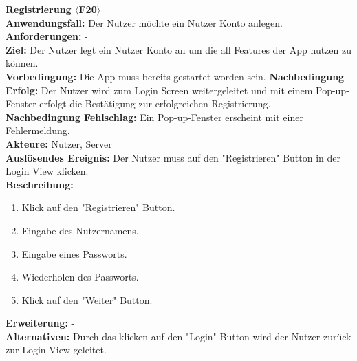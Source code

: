 \documentclass[parskip=full]{scrartcl}
\begin{document}
\textbf{Registrierung $\langle$F20$\rangle$}\\
\textbf{Anwendungsfall:} Der Nutzer möchte ein Nutzer Konto anlegen.\\
\textbf{Anforderungen:} - \\
\textbf{Ziel:} Der Nutzer legt ein Nutzer Konto an um die all Features der App nutzen zu können.\\
\textbf{Vorbedingung:} Die App muss bereits gestartet worden sein.
\textbf{Nachbedingung Erfolg:} Der Nutzer wird zum Login Screen weitergeleitet und mit einem Pop-up-Fenster erfolgt die Bestätigung zur erfolgreichen Registrierung.\\
\textbf{Nachbedingung Fehlschlag:} Ein Pop-up-Fenster erscheint mit einer Fehlermeldung.\\
\textbf{Akteure:} Nutzer, Server\\
\textbf{Auslösendes Ereignis:} Der Nutzer muss auf den "Registrieren" Button in der Login View klicken.\\
\textbf{Beschreibung:}
\begin{enumerate}
    \item Klick auf den "Registrieren" Button.
    \item Eingabe des Nutzernamens.
    \item Eingabe eines Passworts.
    \item Wiederholen des Passworts.
    \item Klick auf den "Weiter" Button.
\end{enumerate}
\textbf{Erweiterung:} -\\
\textbf{Alternativen:} Durch das klicken auf den "Login" Button wird der Nutzer zurück zur Login View geleitet.\\
\newpage
\end{document}
